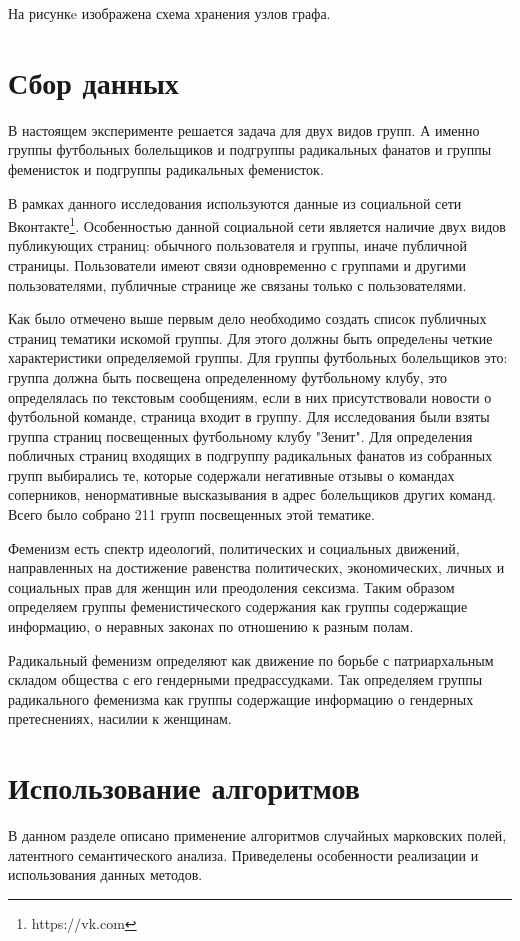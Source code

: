 \documentclass[annotation,times,page4]{itmo-student-thesis}
\begin{document}
На рисункe изображена схема хранения узлов графа.    

\section{Сбор данных}
В настоящем эксперименте решается задача для двух видов групп. А именно группы футбольных болельщиков и подгруппы радикальных фанатов и группы феменисток и подгруппы радикальных феменисток. 

В рамках данного исследования используются данные из социальной сети Вконтакте\footnote{https://vk.com}. Особенностью данной социальной сети является наличие двух видов публикующих страниц: обычного пользователя и группы, иначе публичной страницы. Пользователи имеют связи одновременно с группами и другими пользователями, публичные странице же связаны только с пользователями. 

Как было отмечено выше первым дело необходимо создать список публичных страниц тематики искомой группы. 
Для этого должны быть определeны четкие характеристики определяемой группы.
Для группы футбольных болельщиков это: группа должна быть посвещена определенному футбольному клубу, это определялась по текстовым сообщениям, если в них присутствовали новости о футбольной команде, страница входит в группу. Для исследования были взяты группа страниц посвещенных футбольному клубу "Зенит". Для определения побличных страниц входящих в подгруппу радикальных фанатов из собранных групп выбирались те, которые  содержали негативные отзывы о командах соперников, ненормативные высказывания в адрес болельщиков других команд. Всего было собрано 211 групп посвещенных этой тематике.

Феменизм есть спектр идеологий, политических и социальных движений, направленных на достижение равенства политических, экономических, личных и социальных прав для женщин или преодоления сексизма. Таким образом определяем группы феменистического содержания как группы содержащие информацию, о неравных законах по отношению к разным полам. 

Радикальный феменизм определяют как движение по борьбе с патриархальным складом общества с его гендерными предрассудками. Так определяем группы радикального феменизма как группы содержащие информацию о гендерных претеснениях, насилии к женщинам.

 
\section{Использование алгоритмов}
В данном разделе описано применение алгоритмов случайных марковских полей, латентного семантического анализа. Приведелены особенности реализации и использования данных методов.
\end{document}
